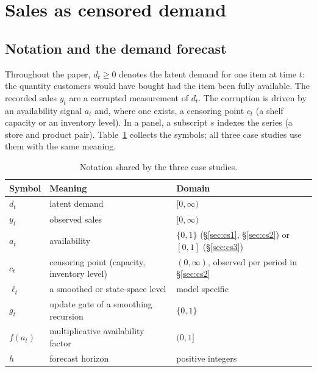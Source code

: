\section{Sales as censored demand}\label{sec:censored}

\subsection{Notation and the demand forecast}\label{sec:notation}

Throughout the paper, $d_t \geq 0$ denotes the latent demand for one item at time $t$: the quantity customers would have bought had the item been fully available. The recorded sales $y_t$ are a corrupted measurement of $d_t$. The corruption is driven by an availability signal $a_t$ and, where one exists, a censoring point $c_t$ (a shelf capacity or an inventory level). In a panel, a subscript $s$ indexes the series (a store and product pair). Table~\ref{tab:notation} collects the symbols; all three case studies use them with the same meaning.

\begin{table}[t]
\centering
\small
\begin{tabular}{lll}
\toprule
Symbol & Meaning & Domain \\
\midrule
$d_t$ & latent demand & $[0, \infty)$ \\
$y_t$ & observed sales & $[0, \infty)$ \\
$a_t$ & availability & $\{0, 1\}$ (\S\ref{sec:cs1}, \S\ref{sec:cs2}) or $[0, 1]$ (\S\ref{sec:cs3}) \\
$c_t$ & censoring point (capacity, inventory level) & $(0, \infty)$, observed per period in \S\ref{sec:cs2} \\
$\ell_t$ & a smoothed or state-space level & model specific \\
$g_t$ & update gate of a smoothing recursion & $\{0, 1\}$ \\
$f(a_t)$ & multiplicative availability factor & $(0, 1]$ \\
$h$ & forecast horizon & positive integers \\
\bottomrule
\end{tabular}
\caption{Notation shared by the three case studies.}
\label{tab:notation}
\end{table}

